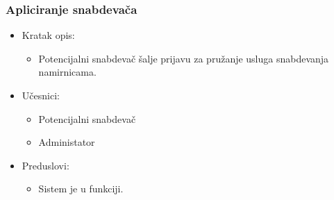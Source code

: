 \subsubsection{Apliciranje snabdevača}

\begin{itemize}
	\item Kratak opis:
		\begin{itemize}
			\item Potencijalni snabdevač šalje prijavu za pružanje usluga snabdevanja namirnicama.
		\end{itemize}
	\item Učesnici:
		\begin{itemize}
			\item Potencijalni snabdevač
			\item Administator
		\end{itemize}	
	\item Preduslovi:
		\begin{itemize}
	       \item Sistem je u funkciji.
		\end{itemize}	


\end{itemize}
